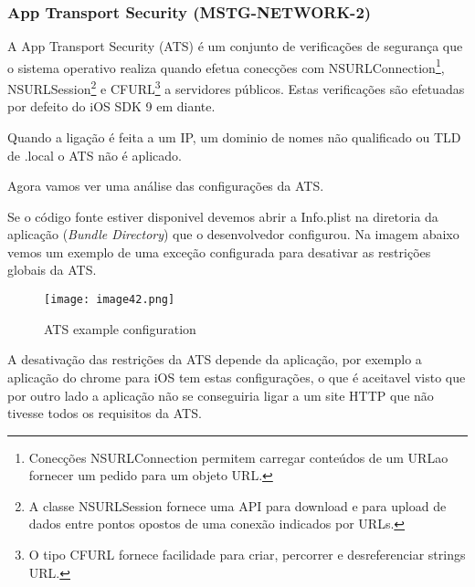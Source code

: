 \subsubsection{App Transport Security (MSTG-NETWORK-2)}
\hfill\par
\hfill\par
 A App Transport Security (ATS) é um conjunto de verificações de segurança que o sistema operativo realiza quando efetua conecções com NSURLConnection\footnote[6]{ Conecções NSURLConnection permitem carregar conteúdos de um URLao fornecer um pedido para um objeto URL\cite{ref_intro4}.}, NSURLSession\footnote[7]{A classe NSURLSession fornece uma API para download e para upload de dados entre pontos opostos de uma conexão indicados por URLs\cite{ref_intro5}.} e CFURL\footnote[8]{ O tipo CFURL fornece facilidade para criar, percorrer e desreferenciar strings URL\cite{ref_intro6}.} a servidores públicos. Estas verificações são efetuadas por defeito do iOS SDK 9 em diante.\par
Quando a ligação é feita a um IP, um dominio de nomes não qualificado ou TLD de .local o ATS não é aplicado.\par
\hfill\par
Agora vamos ver uma análise das configurações da ATS.\par

Se o código fonte estiver disponivel devemos abrir a Info.plist na diretoria da aplicação (\textit{Bundle Directory}) que o desenvolvedor configurou. Na imagem abaixo vemos um exemplo de uma exceção configurada para desativar as restrições globais da ATS.

\begin{figure}[H]
\centering
\texttt{[image: image42.png]}
\caption {ATS example configuration}
\label {fig02}
\end{figure}

A desativação das restrições da ATS depende da aplicação, por exemplo a aplicação do chrome para iOS tem estas configurações, o que é aceitavel visto que por outro lado a aplicação não se conseguiria ligar a um site HTTP que não tivesse todos os requisitos da ATS.

